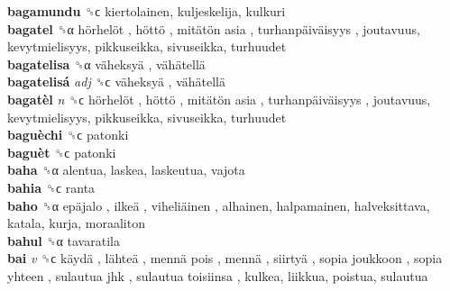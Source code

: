 \textbf{bagamundu} ␝ϲ  kiertolainen, kuljeskelija, kulkuri  \\
\textbf{bagatel} ␝α   hörhelöt ,  höttö ,  mitätön asia ,  turhanpäiväisyys , joutavuus, kevytmielisyys, pikkuseikka, sivuseikka, turhuudet  \\
\textbf{bagatelisa} ␝α   väheksyä ,  vähätellä   \\
\textbf{bagatelisá} \emph{adj}  ␝ϲ   väheksyä ,  vähätellä   \\
\textbf{bagatèl} \emph{n}  ␝ϲ   hörhelöt ,  höttö ,  mitätön asia ,  turhanpäiväisyys , joutavuus, kevytmielisyys, pikkuseikka, sivuseikka, turhuudet  \\
\textbf{baguèchi} ␝ϲ  patonki  \\
\textbf{baguèt} ␝ϲ  patonki  \\
\textbf{baha} ␝α  alentua, laskea, laskeutua, vajota  \\
\textbf{bahia} ␝ϲ  ranta  \\
\textbf{baho} ␝α   epäjalo ,  ilkeä ,  viheliäinen , alhainen, halpamainen, halveksittava, katala, kurja, moraaliton  \\
\textbf{bahul} ␝α  tavaratila  \\
\textbf{bai} \emph{v}  ␝ϲ   käydä ,  lähteä ,  mennä pois ,  mennä ,  siirtyä ,  sopia joukkoon ,  sopia yhteen ,  sulautua jhk ,  sulautua toisiinsa , kulkea, liikkua, poistua, sulautua  \\
